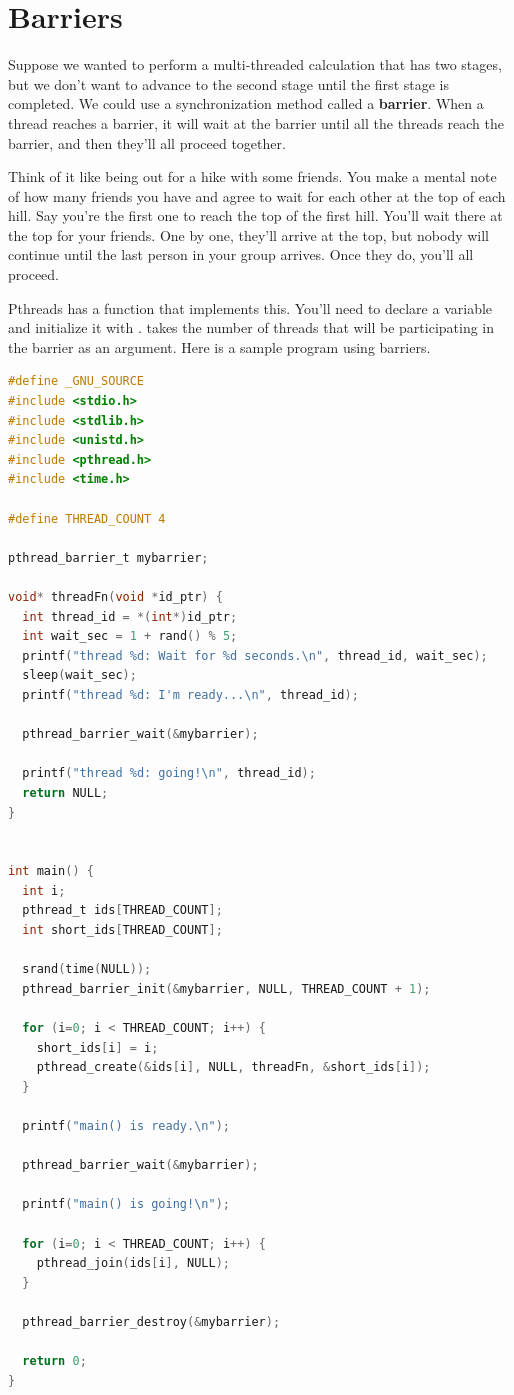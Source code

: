 \section{Barriers}

Suppose we wanted to perform a multi-threaded calculation that has two stages, but we don't want to advance to the second stage until the first stage is completed.
We could use a synchronization method called a \textbf{barrier}. When a thread reaches a barrier, it will wait at the barrier until all the threads reach the barrier, and then they'll all proceed together.

Think of it like being out for a hike with some friends.
You make a mental note of how many friends you have and agree to wait for each other at the top of each hill.
Say you're the first one to reach the top of the first hill.
You'll wait there at the top for your friends.
One by one, they'll arrive at the top, but nobody will continue until the last person in your group arrives.
Once they do, you'll all proceed.

Pthreads has a function  that implements this.
You'll need to declare a  variable and initialize it with .
 takes the number of threads that will be participating in the barrier as an argument.
Here is a sample program using barriers.

\begin{lstlisting}[language=C]
#define _GNU_SOURCE
#include <stdio.h>
#include <stdlib.h>
#include <unistd.h>
#include <pthread.h>
#include <time.h>

#define THREAD_COUNT 4

pthread_barrier_t mybarrier;

void* threadFn(void *id_ptr) {
  int thread_id = *(int*)id_ptr;
  int wait_sec = 1 + rand() % 5;
  printf("thread %d: Wait for %d seconds.\n", thread_id, wait_sec);
  sleep(wait_sec);
  printf("thread %d: I'm ready...\n", thread_id);

  pthread_barrier_wait(&mybarrier);

  printf("thread %d: going!\n", thread_id);
  return NULL;
}


int main() {
  int i;
  pthread_t ids[THREAD_COUNT];
  int short_ids[THREAD_COUNT];

  srand(time(NULL));
  pthread_barrier_init(&mybarrier, NULL, THREAD_COUNT + 1);

  for (i=0; i < THREAD_COUNT; i++) {
    short_ids[i] = i;
    pthread_create(&ids[i], NULL, threadFn, &short_ids[i]);
  }

  printf("main() is ready.\n");

  pthread_barrier_wait(&mybarrier);

  printf("main() is going!\n");

  for (i=0; i < THREAD_COUNT; i++) {
    pthread_join(ids[i], NULL);
  }

  pthread_barrier_destroy(&mybarrier);

  return 0;
}
\end{lstlisting}

